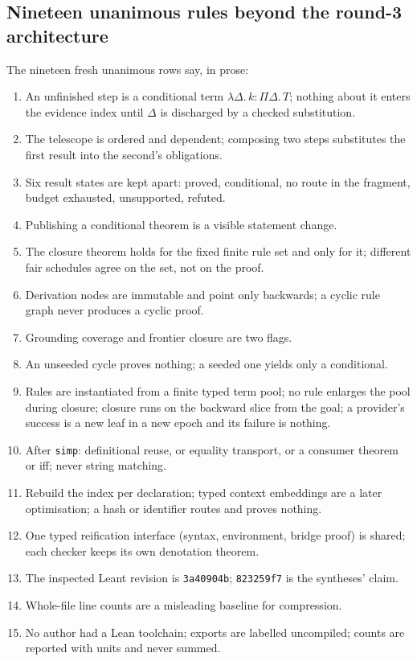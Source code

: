 \documentclass[11pt,a4paper]{article}
\newcommand{\code}[1]{\nolinkurl{#1}}
\theoremstyle{definition}
\theoremstyle{plain}
\begin{document}
\subsection{Nineteen unanimous rules beyond the round-3 architecture}
The nineteen fresh unanimous rows say, in prose:
\begin{enumerate}
\item An unfinished step is a conditional term $\lambda\Delta.\,k:\Pi\Delta.\,T$; nothing about it enters the evidence index until $\Delta$ is discharged by a checked substitution.
\item The telescope is ordered and dependent; composing two steps substitutes the first result into the second's obligations.
\item Six result states are kept apart: proved, conditional, no route in the fragment, budget exhausted, unsupported, refuted.
\item Publishing a conditional theorem is a visible statement change.
\item The closure theorem holds for the fixed finite rule set and only for it; different fair schedules agree on the set, not on the proof.
\item Derivation nodes are immutable and point only backwards; a cyclic rule graph never produces a cyclic proof.
\item Grounding coverage and frontier closure are two flags.
\item An unseeded cycle proves nothing; a seeded one yields only a conditional.
\item Rules are instantiated from a finite typed term pool; no rule enlarges the pool during closure; closure runs on the backward slice from the goal; a provider's success is a new leaf in a new epoch and its failure is nothing.
\item After \code{simp}: definitional reuse, or equality transport, or a consumer theorem or iff; never string matching.
\item Rebuild the index per declaration; typed context embeddings are a later optimisation; a hash or identifier routes and proves nothing.
\item One typed reification interface (syntax, environment, bridge proof) is shared; each checker keeps its own denotation theorem.
\item The inspected Leant revision is \code{3a40904b}; \code{823259f7} is the syntheses' claim.
\item Whole-file line counts are a misleading baseline for compression.
\item No author had a Lean toolchain; exports are labelled uncompiled; counts are reported with units and never summed.
\end{enumerate}
\end{document}

